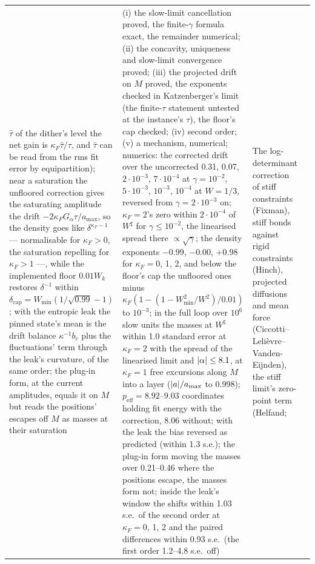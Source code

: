 {\begin{longtable}{@{}>{\raggedright\arraybackslash}p{}>{\raggedright\arraybackslash}p{}%
>{\raggedright\arraybackslash}p{}>{\raggedright\arraybackslash}p{}@{}}
$\hat\tau$ of the dither's level the net gain is $\kappa_F\hat\tau/\tau$, and $\hat\tau$ can be read from the rms fit
error by equipartition); near a saturation the unfloored correction gives the saturating amplitude the drift
$-2\kappa_FG_\alpha\tau/a_{\max}$, so the density goes like $\delta^{\kappa_F - 1}$ --- normalisable for
$\kappa_F > 0$, the saturation repelling for $\kappa_F > 1$ ---, while the implemented floor $0.01W_k$ restores
$\delta^{-1}$ within $\delta_{\mathrm{cap}} = W_{\min}(1/\sqrt{0.99} - 1)$; with the entropic leak the pinned state's
mean is the drift balance $\kappa^{-1}b_c$ plus the fluctuations' term through the leak's curvature, of the same order;
the plug-in form, at the current amplitudes, equals it on $M$ but reads the positions' escapes off $M$ as masses at
their saturation
& (i) the slow-limit cancellation proved, the finite-$\gamma$ formula exact, the remainder numerical; (ii) the
concavity, uniqueness and slow-limit convergence proved; (iii) the projected drift on $M$ proved, the exponents checked
in Katzenberger's limit (the finite-$\tau$ statement untested at the instance's $\tau$), the floor's cap checked; (iv)
second order; (v) a mechanism, numerical; numerics: the corrected drift over the uncorrected 0.31, 0.07,
$2\cdot10^{-3}$, $7\cdot10^{-4}$ at $\gamma = 10^{-2}$, $5\cdot10^{-3}$, $10^{-3}$, $10^{-4}$ at $W = 1/3$, reversed
from $\gamma = 2\cdot10^{-3}$ on; $\kappa_F = 2$'s zero within $2\cdot10^{-4}$ of $W^\sharp$ for $\gamma\le10^{-2}$, the
linearised spread there $\propto\sqrt\gamma$; the density exponents $-0.99$, $-0.00$, $+0.98$ for $\kappa_F = 0$, 1,
2, and below the floor's cap the unfloored ones minus $\kappa_F(1 - (1 - W_{\min}^2/W^2)/0.01)$ to $10^{-3}$; in the
full loop over $10^6$ slow units the masses at $W^\sharp$ within 1.0 standard error at $\kappa_F = 2$ with the spread of
the linearised limit and $\lvert \alpha\rvert\le8.1$, at $\kappa_F = 1$ free excursions along $M$ into a layer
($\lvert a\rvert/a_{\max}$ to 0.998); $p_{\mathrm{eff}} = 8.92$--$9.03$ coordinates holding fit energy with the correction,
8.06 without; with the leak the bias reversed as predicted (within 1.3 s.e.); the plug-in form moving the masses over
0.21--0.46 where the positions escape, the masses form not; inside the leak's window the shifts within 1.03 s.e.\ of
the second order at $\kappa_F = 0$, 1, 2 and the paired differences within 0.93 s.e.\ (the first order 1.2--4.8
s.e.\ off)
& The log-determinant correction of stiff constraints (Fixman), stiff bonds against rigid constraints (Hinch),
projected diffusions and mean force (Ciccotti--Leli\`evre--Vanden-Eijnden), the stiff limit's zero-point term (Helfand;

\end{longtable}}
